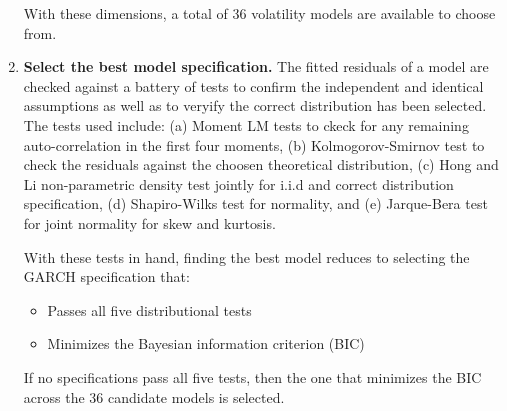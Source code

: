 \documentclass[12pt]{article}
\begin{document}
\begin{enumerate}
    With these dimensions, a total of 36 volatility models are available to choose from.

    \item \textbf{Select the best model specification.} The fitted residuals of a model are checked against a battery of tests to confirm the independent and identical assumptions as well as to veryify the correct distribution has been selected. The tests used include: (a) Moment LM tests to ckeck for any remaining auto-correlation in the first four moments, (b) Kolmogorov-Smirnov test to check the residuals against the choosen theoretical distribution, (c) Hong and Li \cite{HongLi2005} non-parametric density test jointly for i.i.d and correct distribution specification, (d) Shapiro-Wilks \cite{ShapiroWilks1965} test for normality, and (e) Jarque-Bera \cite{JarqueBera1980} test for joint normality for skew and kurtosis.
    
    With these tests in hand, finding the best model reduces to selecting the GARCH specification that:
    
    \begin{itemize}
        \item Passes all five distributional tests
        \item Minimizes the Bayesian information criterion (BIC)
    \end{itemize}

    If no specifications pass all five tests, then the one that minimizes the BIC across the 36 candidate models is selected.

\end{enumerate}

\printbibliography
\end{document}
